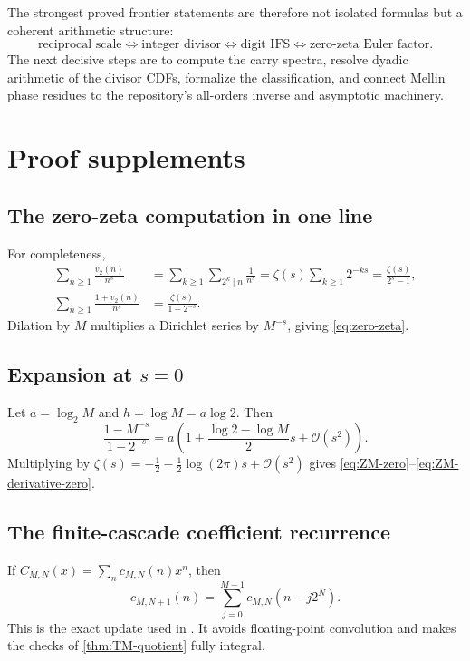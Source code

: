 \documentclass[11pt,oneside]{article}
\theoremstyle{definition}
\theoremstyle{remark}
\newcommand{\bigO}{\mathcal O}
\newcommand{\vtwo}{v_2}
\numberwithin{equation}{section}
\newcommand{\1}{\mathbf 1}
\begin{document}
The strongest proved frontier statements are therefore not isolated formulas but a
coherent arithmetic structure:
\[
 \boxed{
 \text{reciprocal scale}
 \Longleftrightarrow
 \text{integer divisor}
 \Longleftrightarrow
 \text{digit IFS}
 \Longleftrightarrow
 \text{zero-zeta Euler factor}.}
\]
The next decisive steps are to compute the carry spectra, resolve dyadic arithmetic of the
divisor CDFs, formalize the classification, and connect Mellin phase residues to the
repository's all-orders inverse and asymptotic machinery.

\appendix

\section{Proof supplements}
\label{app:proofs}

\subsection{The zero-zeta computation in one line}

For completeness,
\begin{align}
 \sum_{n\ge1}\frac{\vtwo(n)}{n^s}
 &=\sum_{k\ge1}\sum_{2^k\mid n}\frac1{n^s}
 =\zeta(s)\sum_{k\ge1}2^{-ks}
 =\frac{\zeta(s)}{2^s-1},
 \label{eq:v2-Dirichlet}\\
 \sum_{n\ge1}\frac{1+\vtwo(n)}{n^s}
 &=\frac{\zeta(s)}{1-2^{-s}}.
 \label{eq:m-Dirichlet}
\end{align}
Dilation by $M$ multiplies a Dirichlet series by $M^{-s}$, giving
\eqref{eq:zero-zeta}.

\subsection{Expansion at $s=0$}

Let $a=\log_2M$ and $h=\log M=a\log2$.  Then
\begin{equation}
 \frac{1-M^{-s}}{1-2^{-s}}
 =a\left(1+\frac{\log2-\log M}{2}s+\bigO(s^2)\right).
 \label{eq:A-at-zero}
\end{equation}
Multiplying by
$\zeta(s)=-\frac12-\frac12\log(2\pi)s+\bigO(s^2)$ gives
\eqref{eq:ZM-zero}--\eqref{eq:ZM-derivative-zero}.

\subsection{The finite-cascade coefficient recurrence}

If $C_{M,N}(x)=\sum_nc_{M,N}(n)x^n$, then
\begin{equation}
 c_{M,N+1}(n)=\sum_{j=0}^{M-1}c_{M,N}(n-j2^N).
 \label{eq:finite-coeff-recurrence}
\end{equation}
This is the exact update used in .  It avoids floating-point
convolution and makes the checks of \cref{thm:TM-quotient} fully integral.
\end{document}
